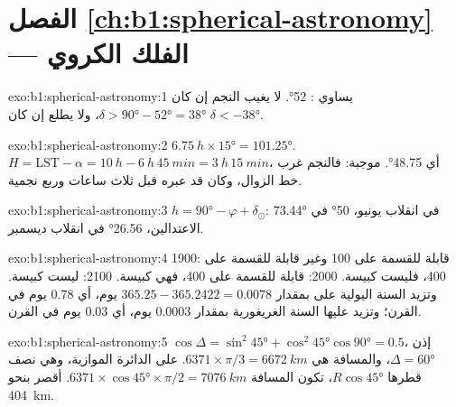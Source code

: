 \section*{الفصل \ref{ch:b1:spherical-astronomy} --- الفلك الكروي}

\begin{solution}{exo:b1:spherical-astronomy:1}
 يساوي : \ang{52}. لا يغيب النجم إن كان
$\delta > \ang{90} - \ang{52} = \ang{38}$، ولا يطلع إن كان
$\delta < \ang{-38}$.
\end{solution}

\begin{solution}{exo:b1:spherical-astronomy:2}
$\qty{6.75}{h}\times\ang{15} = \ang{101.25}$. $H = \mathrm{LST} - \alpha =
\qty{10}{h} - \qty{6}{h}\,\qty{45}{min} = \qty{3}{h}\,\qty{15}{min}$، أي
\ang{48.75}.  موجبة: فالنجم غرب خط الزوال، وكان قد عبره قبل ثلاث ساعات وربع نجمية.
\end{solution}

\begin{solution}{exo:b1:spherical-astronomy:3}
$h = \ang{90} - \varphi + \delta_\odot$: \ang{73.44} في انقلاب يونيو،
\ang{50} في الاعتدالين، \ang{26.56} في انقلاب ديسمبر.
\end{solution}

\begin{solution}{exo:b1:spherical-astronomy:4}
1900: قابلة للقسمة على 100 وغير قابلة للقسمة على 400، فليست كبيسة. 2000: قابلة للقسمة على 400، فهي كبيسة. 2100: ليست كبيسة. وتزيد السنة اليولية على  بمقدار $365.25 - 365.2422 = 0.0078$ يوم، أي \num{0.78} يوم في القرن؛ وتزيد عليها السنة الغريغورية بمقدار $0.0003$ يوم، أي \num{0.03} يوم في القرن.
\end{solution}

\begin{solution}{exo:b1:spherical-astronomy:5}
$\cos\Delta = \sin^2\ang{45} + \cos^2\ang{45}\cos\ang{90} = 0.5$، إذن
$\Delta = \ang{60}$، والمسافة هي $6371\times\pi/3 = \qty{6672}{km}$.
على الدائرة الموازية، وهي  نصف قطرها $R\cos\ang{45}$، تكون المسافة
$6371\times\cos\ang{45}\times\pi/2 = \qty{7076}{km}$.  أقصر بنحو
\qty{404}{km}.
\end{solution}

